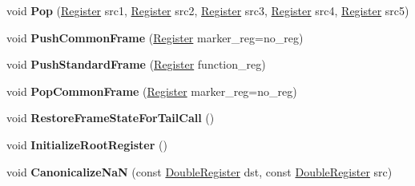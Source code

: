 \begin{DoxyCompactItemize}
\item 
\mbox{\label{classv8_1_1internal_1_1TurboAssembler_a49085fbcfcb2c865f83434ba81487c5f}} 
void {\bfseries Pop} (\mbox{\hyperlink{classv8_1_1internal_1_1Register}{Register}} src1, \mbox{\hyperlink{classv8_1_1internal_1_1Register}{Register}} src2, \mbox{\hyperlink{classv8_1_1internal_1_1Register}{Register}} src3, \mbox{\hyperlink{classv8_1_1internal_1_1Register}{Register}} src4, \mbox{\hyperlink{classv8_1_1internal_1_1Register}{Register}} src5)
\item 
\mbox{\label{classv8_1_1internal_1_1TurboAssembler_ad56dfd9e92f69e11627353ea1cbc7e25}} 
void {\bfseries Push\+Common\+Frame} (\mbox{\hyperlink{classv8_1_1internal_1_1Register}{Register}} marker\+\_\+reg=no\+\_\+reg)
\item 
\mbox{\label{classv8_1_1internal_1_1TurboAssembler_a77b7c5e4d2ca11bf9d8884778cf43efb}} 
void {\bfseries Push\+Standard\+Frame} (\mbox{\hyperlink{classv8_1_1internal_1_1Register}{Register}} function\+\_\+reg)
\item 
\mbox{\label{classv8_1_1internal_1_1TurboAssembler_a34e1b888171edb2b45e4fff23470824b}} 
void {\bfseries Pop\+Common\+Frame} (\mbox{\hyperlink{classv8_1_1internal_1_1Register}{Register}} marker\+\_\+reg=no\+\_\+reg)
\item 
\mbox{\label{classv8_1_1internal_1_1TurboAssembler_a2c0925acdb12fd00b5ca3fe291b77339}} 
void {\bfseries Restore\+Frame\+State\+For\+Tail\+Call} ()
\item 
\mbox{\label{classv8_1_1internal_1_1TurboAssembler_a919c742613dc1bcf65b76c2c8dddde57}} 
void {\bfseries Initialize\+Root\+Register} ()
\item 
\mbox{\label{classv8_1_1internal_1_1TurboAssembler_adb248502face4ee843083cf7cd3b46ae}} 
void {\bfseries Canonicalize\+NaN} (const \mbox{\hyperlink{classv8_1_1internal_1_1DoubleRegister}{Double\+Register}} dst, const \mbox{\hyperlink{classv8_1_1internal_1_1DoubleRegister}{Double\+Register}} src)
\item 

\end{DoxyCompactItemize}

